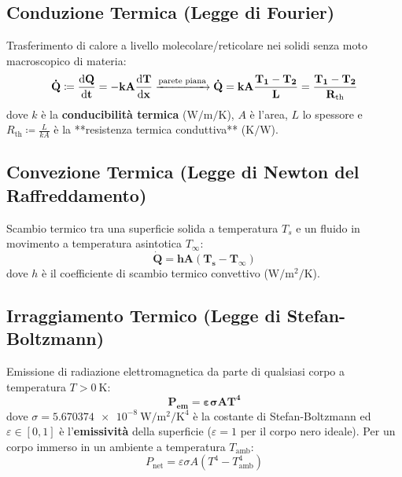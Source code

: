 \subsection{Conduzione Termica (Legge di Fourier)}
Trasferimento di calore a livello molecolare/reticolare nei solidi senza moto macroscopico di materia:
\begin{equation}
    \mathbf{\dot{Q} \coloneqq \frac{\mathrm{d} Q}{\mathrm{d} t} = -k A \frac{\mathrm{d} T}{\mathrm{d} x} \xrightarrow{\text{parete piana}} \dot{Q} = k A \frac{T_1 - T_2}{L} = \frac{T_1 - T_2}{R_{\text{th}}}}
    \label{eq:fourier}
\end{equation}
dove $k$ è la \textbf{conducibilità termica} ($\si{\watt\per\metre\per\kelvin}$), $A$ è l'area, $L$ lo spessore e $R_{\text{th}} \coloneqq \frac{L}{k A}$ è la **resistenza termica conduttiva** ($\si{\kelvin\per\watt}$).

\subsection{Convezione Termica (Legge di Newton del Raffreddamento)}
Scambio termico tra una superficie solida a temperatura $T_s$ e un fluido in movimento a temperatura asintotica $T_\infty$:
\begin{equation}
    \mathbf{\dot{Q} = h A (T_s - T_\infty)}
    \label{eq:convezione}
\end{equation}
dove $h$ è il coefficiente di scambio termico convettivo ($\si{\watt\per\metre\squared\per\kelvin}$).

\subsection{Irraggiamento Termico (Legge di Stefan-Boltzmann)}
Emissione di radiazione elettromagnetica da parte di qualsiasi corpo a temperatura $T > \SI{0}{\kelvin}$:
\begin{equation}
    \mathbf{P_{\text{em}} = \varepsilon \sigma A T^4}
    \label{eq:stefan_boltzmann}
\end{equation}
dove $\sigma = \SI{5.670374e-8}{\watt\per\metre\squared\per\kelvin\tothe{4}}$ è la costante di Stefan-Boltzmann ed $\varepsilon \in [0, 1]$ è l'\textbf{emissività} della superficie ($\varepsilon=1$ per il corpo nero ideale). Per un corpo immerso in un ambiente a temperatura $T_{\text{amb}}$:
\begin{equation}
    P_{\text{net}} = \varepsilon \sigma A (T^4 - T_{\text{amb}}^4)
\end{equation}
